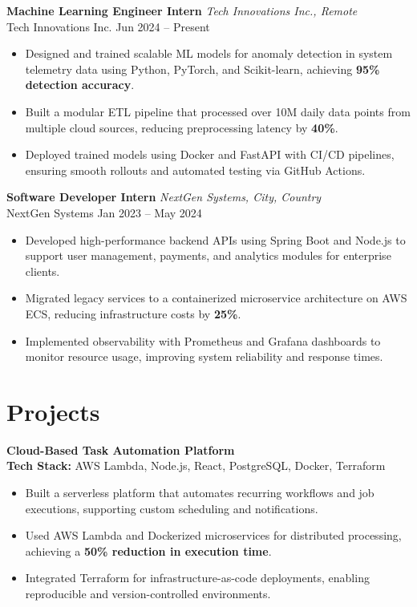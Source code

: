 \documentclass[letterpaper,10.5pt]{article}
\begin{document}
\textbf{Machine Learning Engineer Intern} \hfill \textit{Tech Innovations Inc., Remote}\\[-2pt]
Tech Innovations Inc. \hfill Jun 2024 -- Present
\begin{itemize}\itemsep 1pt
  \item Designed and trained scalable ML models for anomaly detection in system telemetry data using Python, PyTorch, and Scikit-learn, achieving \textbf{95\% detection accuracy}.
  \item Built a modular ETL pipeline that processed over 10M daily data points from multiple cloud sources, reducing preprocessing latency by \textbf{40\%}.
  \item Deployed trained models using Docker and FastAPI with CI/CD pipelines, ensuring smooth rollouts and automated testing via GitHub Actions.
\end{itemize}

\textbf{Software Developer Intern} \hfill \textit{NextGen Systems, City, Country}\\[-2pt]
NextGen Systems \hfill Jan 2023 -- May 2024
\begin{itemize}\itemsep 1pt
  \item Developed high-performance backend APIs using Spring Boot and Node.js to support user management, payments, and analytics modules for enterprise clients.
  \item Migrated legacy services to a containerized microservice architecture on AWS ECS, reducing infrastructure costs by \textbf{25\%}.
  \item Implemented observability with Prometheus and Grafana dashboards to monitor resource usage, improving system reliability and response times.
\end{itemize}

\section{Projects}

\textbf{Cloud-Based Task Automation Platform} \hfill \\
\textbf{Tech Stack:} AWS Lambda, Node.js, React, PostgreSQL, Docker, Terraform
\begin{itemize}\itemsep 1pt
  \item Built a serverless platform that automates recurring workflows and job executions, supporting custom scheduling and notifications.
  \item Used AWS Lambda and Dockerized microservices for distributed processing, achieving a \textbf{50\% reduction in execution time}.
  \item Integrated Terraform for infrastructure-as-code deployments, enabling reproducible and version-controlled environments.
\end{itemize}
\end{document}
